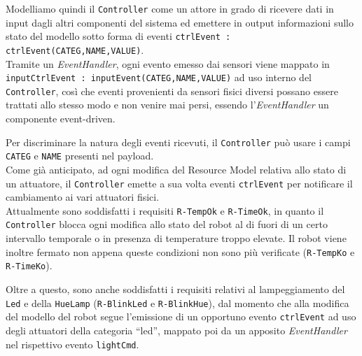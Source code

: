 \documentclass{../llncs}
\newcommand{\codescript}[1]{{\mbox{\small{\texttt{#1}}}}\xspace}
\newcommand{\code}[1]{{\color{blue}\small{\texttt{#1}}}}
\begin{document}
Modelliamo quindi il \texttt{Controller} come un attore in grado di ricevere dati in input dagli altri componenti del sistema ed emettere in output informazioni sullo stato del modello sotto forma di eventi \codescript{ctrlEvent : ctrlEvent(CATEG,NAME,VALUE)}.\\



Tramite un \emph{EventHandler}, ogni evento emesso dai sensori viene mappato in \codescript{inputCtrlEvent : inputEvent(CATEG,NAME,VALUE)} ad uso interno del \texttt{Controller}, così che eventi provenienti da sensori fisici diversi possano essere trattati allo stesso modo e non venire mai persi, %
essendo l'\emph{EventHandler} un componente event-driven.

Per discriminare la natura degli eventi ricevuti, il \texttt{Controller} può usare i campi \codescript{CATEG} e \codescript{NAME} presenti nel payload.\\

Come già anticipato, ad ogni modifica del Resource Model relativa allo stato di un attuatore, il \texttt{Controller} emette a sua volta eventi \codescript{ctrlEvent} per notificare il cambiamento ai vari attuatori fisici.\\



Attualmente sono soddisfatti i requisiti \code{R-TempOk} e \code{R-TimeOk}, in quanto il \texttt{Controller} blocca ogni modifica allo stato del robot al di fuori di un certo intervallo temporale o in presenza di temperature troppo elevate. Il robot viene inoltre fermato non appena queste condizioni non sono più verificate (\code{R-TempKo} e \code{R-TimeKo}).

Oltre a questo, sono anche soddisfatti i requisiti relativi al lampeggiamento del \texttt{Led} e della \texttt{HueLamp} (\code{R-BlinkLed} e \code{R-BlinkHue}), dal momento che alla modifica del modello del robot segue l'emissione di un opportuno evento \codescript{ctrlEvent} ad uso degli attuatori della categoria ``led'', mappato poi da un apposito \emph{EventHandler} nel rispettivo evento \codescript{lightCmd}.\\


\end{document}
